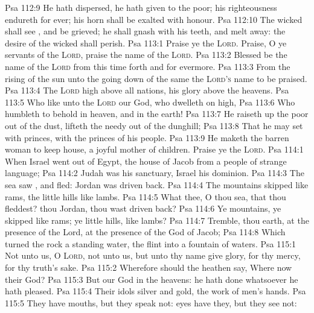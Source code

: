 \vs Psa 112:9 He hath dispersed, he hath given to the poor; his righteousness endureth for ever; his horn shall be exalted with honour.
\vs Psa 112:10 The wicked shall see , and be grieved; he shall gnash with his teeth, and melt away: the desire of the wicked shall perish.
\vs Psa 113:1 Praise ye the \textsc{Lord}. Praise, O ye servants of the \textsc{Lord}, praise the name of the \textsc{Lord}.
\vs Psa 113:2 Blessed be the name of the \textsc{Lord} from this time forth and for evermore.
\vs Psa 113:3 From the rising of the sun unto the going down of the same the \textsc{Lord's} name  to be praised.
\vs Psa 113:4 The \textsc{Lord}  high above all nations,  his glory above the heavens.
\vs Psa 113:5 Who  like unto the \textsc{Lord} our God, who dwelleth on high,
\vs Psa 113:6 Who humbleth  to behold  in heaven, and in the earth!
\vs Psa 113:7 He raiseth up the poor out of the dust,  lifteth the needy out of the dunghill;
\vs Psa 113:8 That he may set  with princes,  with the princes of his people.
\vs Psa 113:9 He maketh the barren woman to keep house,  a joyful mother of children. Praise ye the \textsc{Lord}.
\vs Psa 114:1 When Israel went out of Egypt, the house of Jacob from a people of strange language;
\vs Psa 114:2 Judah was his sanctuary,  Israel his dominion.
\vs Psa 114:3 The sea saw , and fled: Jordan was driven back.
\vs Psa 114:4 The mountains skipped like rams,  the little hills like lambs.
\vs Psa 114:5 What  thee, O thou sea, that thou fleddest? thou Jordan,  thou wast driven back?
\vs Psa 114:6 Ye mountains,  ye skipped like rams;  ye little hills, like lambs?
\vs Psa 114:7 Tremble, thou earth, at the presence of the Lord, at the presence of the God of Jacob;
\vs Psa 114:8 Which turned the rock  a standing water, the flint into a fountain of waters.
\vs Psa 115:1 Not unto us, O \textsc{Lord}, not unto us, but unto thy name give glory, for thy mercy,  for thy truth's sake.
\vs Psa 115:2 Wherefore should the heathen say, Where  now their God?
\vs Psa 115:3 But our God  in the heavens: he hath done whatsoever he hath pleased.
\vs Psa 115:4 Their idols  silver and gold, the work of men's hands.
\vs Psa 115:5 They have mouths, but they speak not: eyes have they, but they see not:

